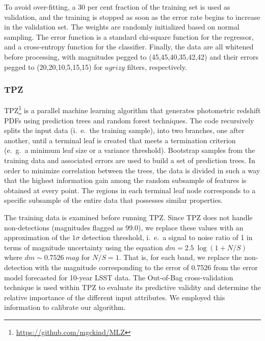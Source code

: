 \documentclass[usenatbib]{mn2e}
\begin{document}
To avoid over-fitting, a $30$ per cent fraction of the training set is used as validation, and the training is stopped as soon as the error rate begins to increase in the validation set. The weights are randomly initialized based on normal sampling. The error function is a standard chi-square function for the regressor, and a cross-entropy function for the classifier. Finally, the data are all whitened before processing, with magnitudes pegged to (45,45,40,35,42,42) and their errors pegged to (20,20,10,5,15,15) for $ugrizy$ filters, respectively.


\subsubsection{TPZ}
\label{sec:tpz}

\textsc{TPZ}\footnote{\url{https://github.com/mgckind/MLZ}} \citep[Trees for Photo-$z$,][]{Carrasco_Kind:13,Carrascokind:14} is a parallel machine learning algorithm that generates photometric redshift PDFs using prediction trees and random forest techniques.
The code recursively splits the input data (i.~e.~the training sample), into two branches, one after another, until a terminal leaf is created that meets a termination criterion (e.~g.~a minimum leaf size or a variance threshold). 
Bootstrap samples from the training data and associated errors are used to build a set of prediction trees.  In order to minimize correlation between the trees, the data is divided in such a way that the highest information gain among the random subsample of features is obtained at every point. The regions in each terminal leaf node corresponds to a specific subsample of the entire data that possesses similar properties. 

The training data is examined before running TPZ. Since TPZ does not handle non-detections (magnitudes flagged as 99.0), we replace these values with an approximation of the $1\sigma$ detection threshold, i.~e.~a signal to noise ratio of 1 in terms of magnitude uncertainty using the equation $dm = 2.5 ~ \log ( 1 + N/S )$ where $dm \sim 0.7526 ~ mag$ for $N/S=1$.  That is, for each band, we replace the non-detection with the magnitude corresponding to the error of 0.7526 from the error model forecasted for 10-year LSST data. The Out-of-Bag \citep{Breiman:84,Carrasco_Kind:13} cross-validation technique is used within TPZ to evaluate its predictive validity and determine the relative importance of the different input attributes. We employed this information to calibrate our algorithm.
\end{document}
